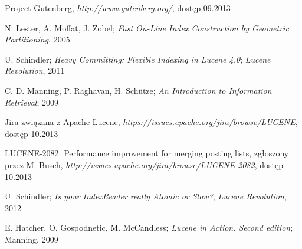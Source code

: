 \begin{thebibliography}{10}
 
  Project Gutenberg, \emph{http://www.gutenberg.org/}, dostęp 09.2013
 
  N. Lester, A. Moffat, J. Zobel; \emph{Fast On-Line Index Construction by Geometric Partitioning}, 2005
 
  U. Schindler; \emph{Heavy Committing: Flexible Indexing in Lucene 4.0}; \emph{Lucene Revolution}, 2011
 
  C. D. Manning, P. Raghavan, H. Sch\"{u}tze; \emph{An Introduction to Information Retrieval}; 2009
 
  Jira związana z Apache Lucene, \emph{https://issues.apache.org/jira/browse/LUCENE}, dostęp 10.2013
 
  LUCENE-2082: Performance improvement for merging posting lists, zgłoszony przez M. Busch, \emph{http://issues.apache.org/jira/browse/LUCENE-2082}, dostęp 10.2013
 
  U. Schindler; \emph{Is your IndexReader really Atomic or Slow?}; \emph{Lucene Revolution}, 2012
 
  E. Hatcher, O. Gospodnetic, M. McCandless; \emph{Lucene in Action. Second edition}; Manning, 2009
 
\end{thebibliography}
